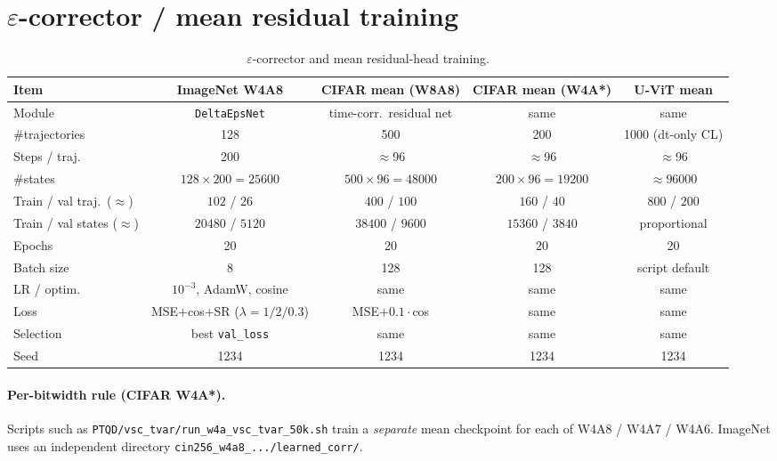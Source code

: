 \documentclass[11pt]{article}
\begin{document}
\section{$\varepsilon$-corrector / mean residual training}

\begin{table}[t]
\centering
\caption{$\varepsilon$-corrector and mean residual-head training.}
\label{tab:corrector}
\footnotesize
\begin{tabular}{@{}lcccc@{}}
\toprule
\textbf{Item}
  & \textbf{ImageNet W4A8}
  & \textbf{CIFAR mean (W8A8)}
  & \textbf{CIFAR mean (W4A*)}
  & \textbf{U-ViT mean} \\
\midrule
Module
  & \texttt{DeltaEpsNet}
  & time-corr.\ residual net
  & same
  & same \\
\#trajectories
  & 128
  & 500
  & 200
  & 1000 (dt-only CL) \\
Steps / traj.
  & 200
  & $\approx$96
  & $\approx$96
  & $\approx$96 \\
\#states
  & $128\times200=25600$
  & $500\times96=48000$
  & $200\times96=19200$
  & $\approx 96000$ \\
Train / val traj.\ ($\approx$)
  & $102$ / $26$
  & $400$ / $100$
  & $160$ / $40$
  & $800$ / $200$ \\
Train / val states ($\approx$)
  & $20480$ / $5120$
  & $38400$ / $9600$
  & $15360$ / $3840$
  & proportional \\
Epochs
  & 20
  & 20
  & 20
  & 20 \\
Batch size
  & 8
  & 128
  & 128
  & script default \\
LR / optim.
  & $10^{-3}$, AdamW, cosine
  & same
  & same
  & same \\
Loss
  & MSE$+$cos$+$SR ($\lambda{=}1/2/0.3$)
  & MSE$+0.1\cdot$cos
  & same
  & same \\
Selection
  & best \texttt{val\_loss}
  & same
  & same
  & same \\
Seed
  & 1234
  & 1234
  & 1234
  & 1234 \\
\bottomrule
\end{tabular}
\end{table}

\paragraph{Per-bitwidth rule (CIFAR W4A*).}
Scripts such as \texttt{PTQD/vsc\_tvar/run\_w4a\_vsc\_tvar\_50k.sh} train a \emph{separate} mean checkpoint for each of W4A8 / W4A7 / W4A6.
ImageNet uses an independent directory \texttt{cin256\_w4a8\_.../learned\_corr/}.
\end{document}
